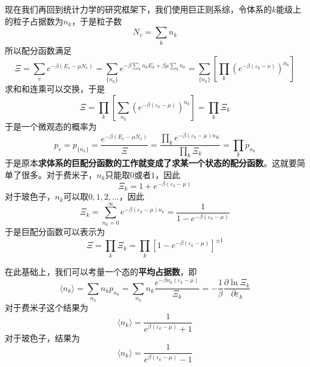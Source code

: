 现在我们再回到统计力学的研究框架下，我们使用巨正则系综，令体系的$k$能级上的粒子占据数为$n_k$，于是粒子数\begin{equation}
    N_v=\sum_{k} n_k
\end{equation}
所以配分函数满足\begin{equation}
    \Xi =\sum_v e^{-\beta (E_v -\mu N_v)}=\sum_{\{n_k\}} e^{-\beta \sum_k n_k E_k +\beta \mu \sum_k n_k}=\sum_{\{n_k\}}\left[ \prod_k \left(e^{-\beta(\varepsilon_k-\nu)}\right)^{n_k}\right]
\end{equation}
求和和连乘可以交换，于是\begin{equation}
    \Xi =\prod_{k} \left[\sum_{n_k} \left(e^{-\beta(\varepsilon_k-\mu)}\right)^{n_k}\right] =\prod_k \Xi_k
\end{equation}
于是一个微观态的概率为\begin{equation}
    p_v =p_{\{n_k\}}=\frac{e^{-\beta (E_v -\mu N_v)}}{\Xi}=\frac{\prod_k e^{-\beta(\varepsilon_k-\mu)n_K}}{\prod_k\Xi_k}=\prod_k p_{n_k}
\end{equation}
于是原本\textbf{求体系的巨配分函数的工作就变成了求某一个状态的配分函数}。这就要简单了很多。对于费米子，$n_k$只能取$0$或者$1$，因此\begin{equation}
    \Xi_k=1+e^{-\beta(\varepsilon_k-\mu)}
\end{equation}
对于玻色子，$n_k$可以取$0,1,2,...$，因此\begin{equation}
    \Xi_k=\sum_{n_k=0}^{\infty} e^{-\beta(\varepsilon_k-\mu)n_k}=\frac{1}{1-e^{-\beta(\varepsilon_k-\mu)}}
\end{equation}
于是巨配分函数可以表示为\begin{equation}
    \Xi =\prod_k \Xi_k=\prod_k \left[1-e^{-\beta(\varepsilon_k-\mu)}\right]^{\pm 1}
\end{equation}

在此基础上，我们可以考量一个态的\textbf{平均占据数}，即\begin{equation}
    \langle n_k\rangle =\sum_{n_k} n_k p_{n_k}=\sum_{n_k} n_k \frac{e^{-\beta n_k (\varepsilon_k-\mu)}}{\Xi_{k}}=-\frac1\beta \frac{\partial \ln \Xi_k}{\partial \varepsilon_k}
\end{equation}
对于费米子这个结果为\begin{equation}
    \langle n_k\rangle =\frac{1}{e^{\beta(\varepsilon_k-\mu)}+1}
\end{equation}
对于玻色子，结果为\begin{equation}
    \langle n_k\rangle =\frac{1}{e^{\beta(\varepsilon_k-\mu)}-1}
\end{equation}

